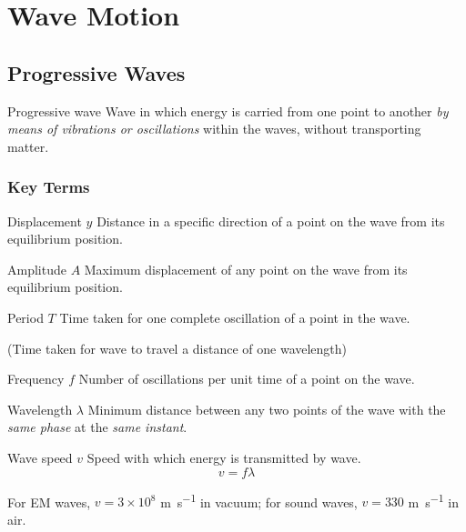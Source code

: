 \section{Wave Motion}
\subsection{Progressive Waves}
\begin{defn}{Progressive wave}{}
Wave in which energy is carried from one point to another \emph{by means of vibrations or oscillations} within the waves, without transporting matter.
\end{defn}

\subsubsection{Key Terms}
\begin{defn}{Displacement $y$}{}
Distance in a specific direction of a point on the wave from its equilibrium position.
\end{defn}

\begin{defn}{Amplitude $A$}{}
Maximum displacement of any point on the wave from its equilibrium position. 
\end{defn}

\begin{defn}{Period $T$}{}
Time taken for one complete oscillation of a point in the wave.

(Time taken for wave to travel a distance of one wavelength)
\end{defn}

\begin{defn}{Frequency $f$}{}
Number of oscillations per unit time of a point on the wave.
\end{defn}

\begin{defn}{Wavelength $\lambda$}{}
Minimum distance between any two points of the wave with the \emph{same phase} at the \emph{same instant}.
\end{defn}

\begin{defn}{Wave speed $v$}{}
Speed with which energy is transmitted by wave.
\begin{equation}
v=f\lambda
\end{equation}
\end{defn}

\begin{remark}
For EM waves, $v=3\times10^8$ \unit{m.s^{-1}} in vacuum; for sound waves, $v=330$ \unit{m.s^{-1}} in air.
\end{remark}

